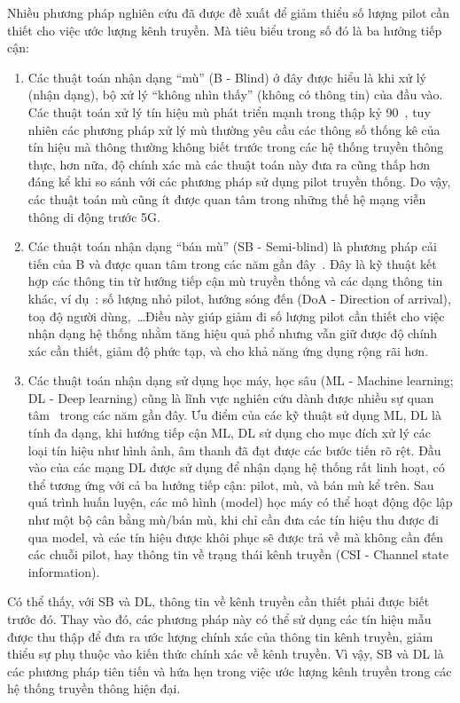 Nhiều phương pháp nghiên cứu đã được đề xuất để giảm thiểu số lượng pilot cần thiết cho việc ước lượng kênh truyền. Mà tiêu biểu trong số đó là ba hướng tiếp cận: 
\begin{enumerate}
    \item Các thuật toán nhận dạng ``mù'' (B - Blind) ở đây được hiểu là khi xử lý (nhận dạng), bộ xử lý ``không nhìn thấy'' (không có thông tin) của đầu vào. Các thuật toán xử lý tín hiệu mù phát triển mạnh trong thập kỷ 90~\cite{abed1997}, tuy nhiên các phương pháp xử lý mù thường yêu cầu các thông số thống kê của tín hiệu mà thông thường không biết trước trong các hệ thống truyền thông thực, hơn nữa, độ chính xác mà các thuật toán này đưa ra cũng thấp hơn đáng kể khi so sánh với các phương pháp sử dụng pilot truyền thống. Do vậy, các thuật toán mù cũng ít được quan tâm trong những thế hệ mạng viễn thông di động trước 5G.

    \item Các thuật toán nhận dạng ``bán mù'' (SB - Semi-blind) là phương pháp cải tiến của B và được quan tâm trong các năm gần đây~\cite{Ladaycia2017, Ladaycia2019, shaik2021}. Đây là kỹ thuật kết hợp các thông tin từ hướng tiếp cận mù truyền thống và các dạng thông tin khác, ví dụ~\cite{Rekik2021}: số lượng nhỏ pilot, hướng sóng đến (DoA - Direction of arrival), toạ độ người dùng,~\ldots Điều này giúp giảm đi số lượng pilot cần thiết cho việc nhận dạng hệ thống nhằm tăng hiệu quả phổ nhưng vẫn giữ được độ chính xác cần thiết, giảm độ phức tạp, và cho khả năng ứng dụng rộng rãi hơn.

    \item Các thuật toán nhận dạng sử dụng học máy, học sâu (ML - Machine learning; DL - Deep learning) cũng là lĩnh vực nghiên cứu dành được nhiều sự quan tâm~\cite{Zhang2019} trong các năm gần đây. Ưu điểm của các kỹ thuật sử dụng ML, DL là tính đa dạng, khi hướng tiếp cận ML, DL sử dụng cho mục đích xử lý các loại tín hiệu như hình ảnh, âm thanh đã đạt được các bước tiến rõ rệt. Đầu vào của các mạng DL được sử dụng để nhận dạng hệ thống rất linh hoạt, có thể tương ứng với cả ba hướng tiếp cận: pilot, mù, và bán mù kể trên. Sau quá trình huấn luyện, các mô hình (model) học máy có thể hoạt động độc lập như một bộ cân bằng mù/bán mù, khi chỉ cần đưa các tín hiệu thu được đi qua model, và các tín hiệu được khôi phục sẽ được trả về mà không cần đến các chuỗi pilot, hay thông tin về trạng thái kênh truyền (CSI - Channel state information).
\end{enumerate}

Có thể thấy, với SB và DL, thông tin về kênh truyền cần thiết phải được biết trước đó. Thay vào đó, các phương pháp này có thể sử dụng các tín hiệu mẫu được thu thập để đưa ra ước lượng chính xác của thông tin kênh truyền, giảm thiểu sự phụ thuộc vào kiến thức chính xác về kênh truyền. Vì vậy, SB và DL là các phương pháp tiên tiến và hứa hẹn trong việc ước lượng kênh truyền trong các hệ thống truyền thông hiện đại.

